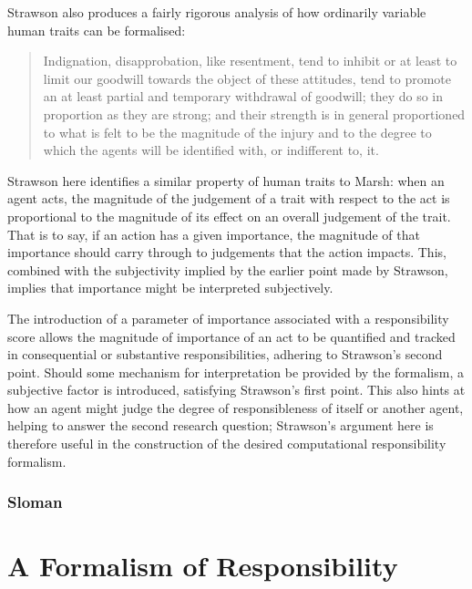 Strawson also produces a fairly rigorous analysis of how ordinarily variable human traits can be formalised:

\begin{quotation}
    Indignation, disapprobation, like resentment, tend to inhibit or at least to limit our goodwill towards the object of these attitudes, tend to promote an at least partial and temporary withdrawal of goodwill; they do so in proportion as they are strong; and their strength is in general proportioned to what is felt to be the magnitude of the injury and to the degree to which the agents will be identified with, or indifferent to, it.\cite{strawson}
\end{quotation}

Strawson here identifies a similar property of human traits to Marsh: when an agent acts, the magnitude of the judgement of a trait with respect to the act is proportional to the magnitude of its effect on an overall judgement of the trait. That is to say, if an action has a given importance, the magnitude of that importance should carry through to judgements that the action impacts. This, combined with the subjectivity implied by the earlier point made by Strawson, implies that importance might be interpreted subjectively.\par

The introduction of a parameter of importance associated with a responsibility score allows the magnitude of importance of an act to be quantified and tracked in consequential or substantive responsibilities, adhering to Strawson's second point. Should some mechanism for interpretation be provided by the formalism, a subjective factor is introduced, satisfying Strawson's first point. This also hints at how an agent might judge the degree of responsibleness of itself or another agent, helping to answer the second research question; Strawson's argument here is therefore useful in the construction of the desired computational responsibility formalism.\par

\subsubsection{Sloman}  %



\section{A Formalism of Responsibility}

